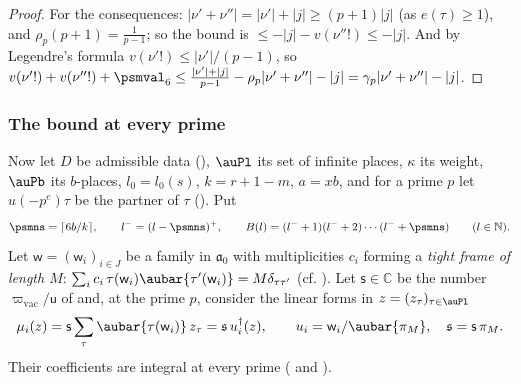 \documentclass[10pt]{amsart}
\theoremstyle{definition}
\theoremstyle{remark}
\newcommand{\C}{\mathbb C}
\newcommand{\N}{\mathbb N}
\begin{document}
\begin{proof}
For the consequences: $|\nu'+\nu''|=|\nu'|+|j|\ge(p+1)|j|$ (as $e(\tau)\ge1$), and
$\rho_p(p+1)=\frac1{p-1}$; so the bound is $\le-|j|-v(\nu''!)\le-|j|$. And by Legendre's formula
$v(\nu'!)\le|\nu'|/(p-1)$, so $v(\nu'!)+v(\nu''!)+\psmval_6\le\frac{|\nu'|+|j|}{p-1}-\rho_p|\nu'+
\nu''|-|j|=\gamma_p|\nu'+\nu''|-|j|$.
\end{proof}

\subsubsection{The bound at every prime}\label{psm:ss-twelve}

Now let $D$ be admissible data ({\cite[Definition~13.3]{P46}}), $\auPl$ its set of infinite places,
$\kappa$ its weight, $\auPb$ its $b$-places, $l_0=l_0(s)$, $k=r+1-m$, $a=xb$, and for a prime $p$
let $u(-p^e)\tau$ be the partner of $\tau$ ({\cite[\S14.4]{P46}}). Put
\[
\psmns=\lceil6b/k\rceil,\qquad l^-=(l-\psmns)^+,\qquad B(l)=(l^-+1)(l^-+2)\cdots(l^-+\psmns)
\qquad(l\in\N).
\]
Let $\mathsf w=(\mathsf w_i)_{i\in J}$ be a family in $\mathfrak a_0$ with multiplicities $c_i$
forming a \emph{tight frame of length $M$}: $\sum_ic_i\,\tau(\mathsf w_i)\aubar{\tau'(\mathsf w_i)}=
M\delta_{\tau\tau'}$ (cf. {\cite[\S7.4]{P49}}). Let $\mathsf s\in\C$ be the number
$\varpi_{\mathrm{vac}}/\mathsf u$ of {\cite[\S7.4]{P49}} and, at the prime $p$, consider the linear
forms in $z=(z_\tau)_{\tau\in\auPl}$
\[
\mu_i(z)=\mathsf s\sum_\tau\aubar{\tau(\mathsf w_i)}\,z_\tau=\mathfrak s\,u_i^\dagger(z),\qquad
u_i=\mathsf w_i/\aubar{\pi_M},\quad\mathfrak s=\mathsf s\,\pi_M .
\]
Their coefficients are integral at every prime ({\cite[Lemma~7.12]{P49}} and {\cite[Corollary~7.3]{P49}}).
\end{document}
